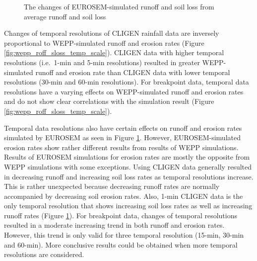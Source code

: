 \begin{figure}[p]
  \centering
  \caption{The changes of EUROSEM-simulated runoff and soil loss from average
runoff and soil loss}
  \label{fig:eurosem_roff_sloss_temp_scale}
\end{figure}

Changes of temporal resolutions of CLIGEN rainfall data are inversely
proportional to WEPP-simulated runoff and erosion rates (Figure
\ref{fig:wepp_roff_sloss_temp_scale}). CLIGEN data with higher temporal
resolutions (i.e.\ 1-min and 5-min resolutions) resulted in greater
WEPP-simulated runoff and erosion rate than CLIGEN data with lower temporal
resolutions (30-min and 60-min resolutions). For breakpoint data, temporal data
resolutions have a varying effects on WEPP-simulated runoff and erosion rates
and do not show clear correlations with the simulation result (Figure
\ref{fig:wepp_roff_sloss_temp_scale}).

Temporal data resolutions also have certain effects on runoff and erosion rates
simulated by EUROSEM as seen in Figure \ref{fig:eurosem_roff_sloss_temp_scale}.
However, EUROSEM-simulated erosion rates show rather different results from
results of WEPP simulations. Results of EUROSEM simulations for erosion rates
are mostly the opposite from WEPP simulations with some exceptions. Using CLIGEN
data generally resulted in decreasing runoff and increasing soil loss rates as
temporal resolutions increase. This is rather unexpected because decreasing
runoff rates are normally accompanied by decreasing soil erosion rates. Also,
1-min CLIGEN data is the only temporal resolution that shows increasing soil
loss rates as well as increasing runoff rates (Figure
\ref{fig:eurosem_roff_sloss_temp_scale}). For breakpoint data, changes of
temporal resolutions resulted in a moderate increasing trend in both runoff and
erosion rates. However, this trend is only valid for three temporal
resolution (15-min, 30-min and 60-min). More conclusive results could be
obtained when more temporal resolutions are considered.


